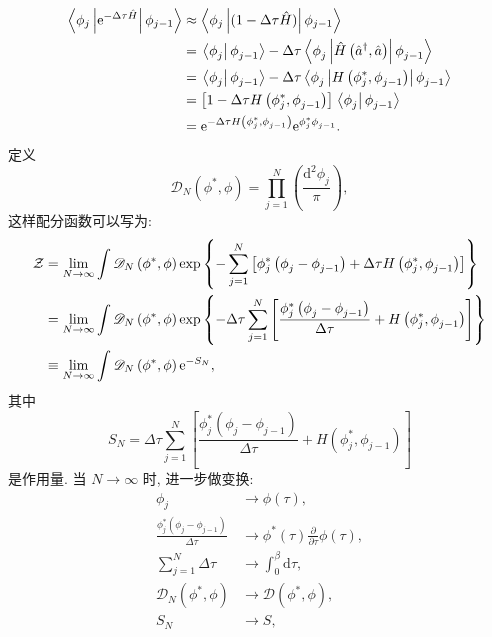 \begin{align}
\left\langle\phi_{j}\left|\mathrm{e}^{-\Delta \tau \hat{H}}\right| \phi_{j-1}\right\rangle & \approx\left\langle\phi_{j}\left|(1-\Delta \tau \hat{H})\right| \phi_{j-1}\right\rangle \nonumber\\
&=\left.\left\langle\phi^{}_{j} \right| \phi^{}_{j-1}\right\rangle-\Delta \tau\left\langle\phi^{}_{j}\left|\hat{H}\left(\hat{a}^{\dagger}, \hat{a}\right)\right| \phi^{}_{j-1}\right\rangle \nonumber\\
&=\left.\left\langle\phi^{}_{j} \right| \phi^{}_{j-1}\right\rangle-\Delta \tau\left\langle\phi^{}_{j}\left|H\left(\phi_{j}^{*}, \phi^{}_{j-1}\right)\right| \phi^{}_{j-1}\right\rangle\nonumber \\
&=\left[1-\Delta \tau H\left(\phi_{j}^{*}, \phi^{}_{j-1}\right)\right]\left.\left\langle\phi^{}_{j} \right| \phi^{}_{j-1}\right\rangle \nonumber\\
&=\mathrm{e}^{-\Delta \tau H\left(\phi_{j}^{*}, \phi^{}_{j-1}\right)} \mathrm{e}^{\phi_{j}^{*} \phi^{}_{j-1}}.
\end{align}
定义
\begin{equation}
\mathscr{D}_{N}\left(\phi^{*}, \phi\right)=\prod_{j=1}^{N}\left(\frac{\mathrm{d}^{2} \phi_{j}}{\pi}\right),
\end{equation}
这样配分函数可以写为:
\begin{align}
\mathcal{Z} &=\lim _{N \rightarrow \infty} \int \mathscr{D}_{N}\left(\phi^{*}, \phi\right) \exp \left\{-\sum_{j=1}^{N}\left[\phi_{j}^{*}\left(\phi^{}_{j}-\phi^{}_{j-1}\right)+\Delta \tau H\left(\phi_{j}^{*}, \phi^{}_{j-1}\right)\right]\right\} \nonumber\\
&=\lim _{N \rightarrow \infty}\int \mathscr{D}_{N}\left(\phi^{*}, \phi\right) \exp \left\{-\Delta \tau \sum_{j=1}^{N}\left[ \frac{\phi_{j}^{*}\left(\phi^{}_{j}-\phi^{}_{j-1}\right)}{\Delta \tau}+H\left(\phi_{j}^{*}, \phi^{}_{j-1}\right)\right]\right\} \nonumber\\
&\equiv\lim _{N \rightarrow \infty} \int \mathscr{D}_{N}\left(\phi^{*}, \phi\right) \mathrm{e}^{-S_{N}},
\end{align}
其中
\begin{equation}
S_{N}=\Delta \tau \sum_{j=1}^{N}\left[ \frac{\phi_{j}^{*}\left(\phi^{}_{j}-\phi^{}_{j-1}\right)}{\Delta \tau}+H\left(\phi_{j}^{*}, \phi^{}_{j-1}\right)\right]
\end{equation}
是作用量. 当 $N \to\infty$ 时, 进一步做变换:
\begin{align}
\phi_{j} & \rightarrow \phi(\tau), \nonumber\\
\frac{\phi_{j}^{*}\left(\phi^{}_{j}-\phi^{}_{j-1}\right)}{\Delta \tau}& \rightarrow \phi^{*}(\tau) \frac{\partial}{\partial \tau} \phi(\tau), \nonumber\\
\sum_{j=1}^{N}\Delta \tau & \rightarrow \int_{0}^{\beta} \mathrm{d} \tau,\nonumber \\
\mathscr{D}_{N}\left(\phi^{*}, \phi\right) & \rightarrow \mathscr{D}\left(\phi^{*}, \phi\right),\nonumber\\
S_N&\rightarrow S,
\end{align}
